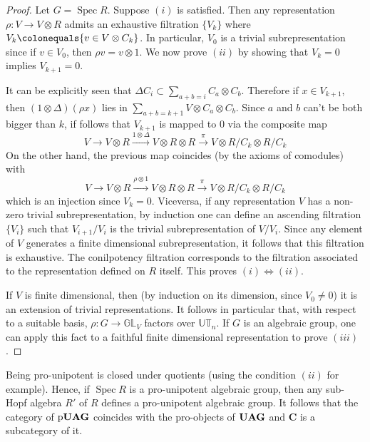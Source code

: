 \documentclass{amsart}
\theoremstyle{definition}
\theoremstyle{remark}
\theoremstyle{remark}
\newcommand{\GL}{\mathbb{GL}}
\newcommand{\cat}{\mathbf{C}}%
\newcommand{\ra}{\rightarrow}
\newcommand{\mcO}{\mathcal{O}}
\DeclareMathOperator{\Spec}{Spec}
\DeclareMathOperator{\pUAG}{p\bf{UAG}}
\DeclareMathOperator{\UAG}{\bf{UAG}}
\begin{document}
\begin{proof}
Let $G=\Spec R$. Suppose $(i)$ is satisfied. Then any representation $\rho\colon V\ra V\otimes R$ admits an exhaustive filtration $\{V_k\}$ where $V_k\colonequals\{v\in V\otimes C_k\}$. In particular, $V_0$ is a trivial subrepresentation since if $v\in V_0$, then $\rho v=v\otimes1$. We now prove $(ii)$ by showing that $V_k=0$ implies $V_{k+1}=0$.

It can be explicitly seen that $\Delta C_i\subset\sum_{a+b=i} C_a\otimes C_{b}$. Therefore if $x\in V_{k+1}$, then $(1\otimes\Delta)(\rho x)$ lies in $\sum_{a+b=k+1} V\otimes C_{a}\otimes C_{b}$. Since $a$ and $b$ can't be both bigger than $k$, if follows that $V_{k+1}$ is mapped to $0$ via the composite map
\[
V\ra V\otimes R\stackrel{1\otimes\Delta}{\rightarrow}V\otimes R\otimes R\stackrel{\pi}{\rightarrow}V\otimes R/C_k\otimes R/C_k
\]
On the other hand, the previous map coincides (by the axioms of comodules) with
\[
V\ra V\otimes R\stackrel{\rho\otimes1}{\rightarrow}V\otimes R\otimes R\stackrel{\pi}{\rightarrow}V\otimes R/C_k\otimes R/C_k
\]
which is an injection since $V_k=0$. Viceversa, if any representation $V$ has a non-zero trivial subrepresentation, by induction one can define an ascending filtration $\{V_i\}$ such that $V_{i+1}/V_{i}$ is the trivial subrepresentation of $V/V_i$. Since any element of $V$ generates a finite dimensional subrepresentation, it follows that this filtration is exhaustive. The conilpotency filtration corresponds to the filtration associated to the representation defined on $R$ itself. This proves $(i)\Leftrightarrow(ii)$.

If $V$ is finite dimensional, then (by induction on its dimension, since $V_0\neq0$) it is an extension of trivial representations. It follows in particular that, with respect to a suitable basis, $\rho\colon G\ra\GL_V$ factors over $\mathbb{UT}_n$. If $G$ is an algebraic group, one can apply this fact to a faithful finite dimensional representation to prove $(iii)$.
\end{proof}

Being pro-unipotent is closed under quotients (using the condition $(ii)$ for example). Hence, if $\Spec R$ is a pro-unipotent algebraic group, then any sub-Hopf algebra $R'$ of $R$ defines a pro-unipotent algebraic group. It follows that the category of $\pUAG$ coincides with the pro-objects of $\UAG$ and $\cat$ is a subcategory of it.%
\end{document}
